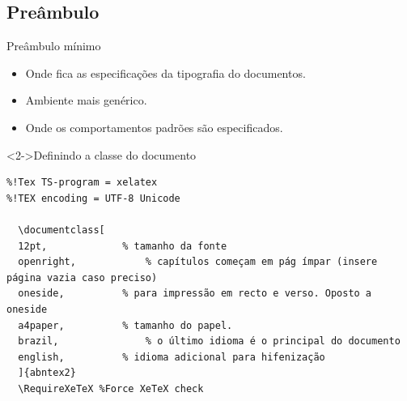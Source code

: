 \documentclass[bigger]{beamer}
\begin{document}
\subsection{Preâmbulo}
\label{sec:org4466d6b}
\begin{frame}[label={sec:orgf9839c3},fragile]{Preâmbulo mínimo}
 \begin{itemize}
\item Onde fica as especificações da tipografia do documentos.
\item Ambiente mais genérico.
\item Onde os comportamentos padrões são especificados.
\end{itemize}
\begin{block}<2->{Definindo a classe do documento}
\begin{verbatim}
%!Tex TS-program = xelatex
%!TEX encoding = UTF-8 Unicode

  \documentclass[
  12pt,				% tamanho da fonte
  openright,			% capítulos começam em pág ímpar (insere página vazia caso preciso)
  oneside,			% para impressão em recto e verso. Oposto a oneside
  a4paper,			% tamanho do papel.
  brazil,				% o último idioma é o principal do documento
  english,			% idioma adicional para hifenização
  ]{abntex2}
  \RequireXeTeX %Force XeTeX check
\end{verbatim}
\end{block}
\end{frame}
\end{document}
